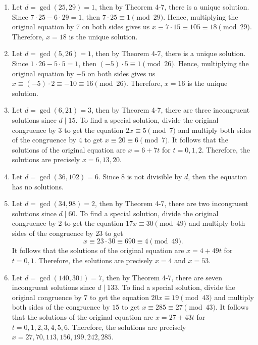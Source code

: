 \begin{solution}
    \begin{enumerate}
        \item Let $d = \gcd(25, 29) = 1$, then by Theorem 4-7, there is a unique solution. Since $7\cdot 25 - 6 \cdot 29 = 1$, then $7 \cdot 25 \equiv 1 \pmod{29}$. Hence, multiplying the original equation by 7 on both sides gives us $x \equiv 7 \cdot 15 \equiv 105 \equiv 18 \pmod{29}$. Therefore, $x = 18$ is the unique solution.
        \item Let $d = \gcd(5, 26) = 1$, then by Theorem 4-7, there is a unique solution. Since $1\cdot 26 - 5 \cdot 5 = 1$, then $(-5) \cdot 5 \equiv 1 \pmod{26}$. Hence, multiplying the original equation by $-5$ on both sides gives us $x \equiv (-5) \cdot 2 \equiv -10 \equiv 16 \pmod{26}$. Therefore, $x = 16$ is the unique solution.
        \item Let $d = \gcd(6, 21) = 3$, then by Theorem 4-7, there are three incongruent solutions since $d \mid 15$. To find a special solution, divide the original congruence by 3 to get the equation $2x \equiv 5 \pmod{7}$ and multiply both sides of the congruence by $4$ to get $x \equiv 20 \equiv 6 \pmod{7}$. It follows that the solutions of the original equation are $x = 6 + 7t$ for $t = 0,1,2$. Therefore, the solutions are precisely $x = 6, 13, 20$.
        \item Let $d = \gcd(36, 102) = 6$. Since 8 is not divisible by $d$, then the equation has no solutions.
        \item Let $d = \gcd(34, 98) = 2$, then by Theorem 4-7, there are two incongruent solutions since $d \mid 60$. To find a special solution, divide the original congruence by 2 to get the equation $17x \equiv 30 \pmod{49}$ and multiply both sides of the congruence by $23$ to get
        $$x \equiv 23\cdot 30 \equiv 690 \equiv 4 \pmod{49}.$$ It follows that the solutions of the original equation are $x = 4 + 49t$ for $t = 0,1$. Therefore, the solutions are precisely $x = 4$ and $x = 53$.
        \item Let $d = \gcd(140, 301) = 7$, then by Theorem 4-7, there are seven incongruent solutions since $d \mid 133$. To find a special solution, divide the original congruence by 7 to get the equation $20x \equiv 19 \pmod{43}$ and multiply both sides of the congruence by $15$ to get $x \equiv 285 \equiv 27 \pmod{43}$. It follows that the solutions of the original equation are $x = 27 + 43t$ for $t = 0,1,2,3,4,5,6$. Therefore, the solutions are precisely $x = 27, 70, 113, 156, 199, 242, 285$. \\
    \end{enumerate}
\end{solution}

